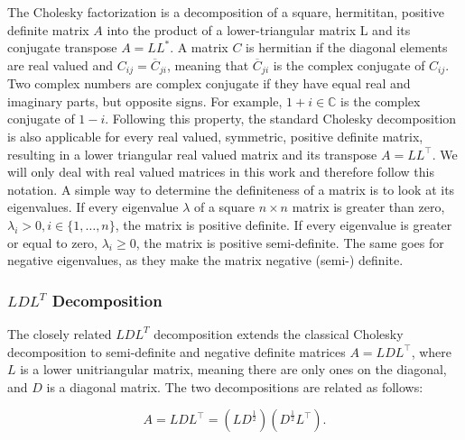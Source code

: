 The Cholesky factorization is a decomposition of a square, hermititan,
positive definite matrix $A$ into the product of a lower-triangular
matrix L and its conjugate transpose $A = L L^*$. A matrix $C$ is
hermitian if the diagonal elements are real valued and $C_{ij} =
\overline{C}_{ji}$, meaning that $\overline{C}_{ji}$ is the complex
conjugate of $C_{ij}$. Two complex numbers are complex conjugate if they
have equal real and imaginary parts, but opposite signs. For example,
$1+i \in \mathbb{C}$ is the complex conjugate of $1-i$. Following this
property, the standard Cholesky decomposition is also applicable for
every real valued, symmetric, positive definite matrix, resulting in a
lower triangular real valued matrix and its transpose $A = L L^\top$. We
will only deal with real valued matrices in this work and therefore
follow this notation. A simple way to determine the definiteness of a
matrix is to look at its eigenvalues. If every eigenvalue $\lambda$ of a
square $n \times n$ matrix is greater than zero, $\lambda_{i} > 0, i \in
\{1,\dots,n\}$, the matrix is positive definite. If every eigenvalue is
greater or equal to zero, $\lambda_{i} \ge 0$, the matrix is positive
semi-definite. The same goes for negative eigenvalues, as they make the
matrix negative (semi-) definite.

\subsubsection{$LDL^T$ Decomposition}

The closely related $LDL^T$ decomposition extends the classical Cholesky
decomposition to semi-definite and negative definite matrices $A = L D
L^\top$, where $L$ is a lower unitriangular matrix, meaning there are
only ones on the diagonal, and $D$ is a diagonal matrix. The two
decompositions are related as follows:

\begin{equation}\label{eq:LDL}
  A = LDL^\top = (L D^\frac{1}{2}) (D^\frac{1}{2}  L^\top).
\end{equation}

